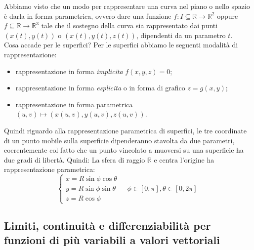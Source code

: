 \documentclass[a4paper]{article}
\numberwithin{equation}{subsection}
\begin{document}
Abbiamo visto che un modo per rappresentare una curva nel piano o nello spazio è darla in forma parametrica,
ovvero dare una funzione $f : I \subseteq{\mathbb{R} \rightarrow \mathbb{R}^2}$ oppure $f \subseteq \mathbb{R} \rightarrow \mathbb{R}^3$
tale che il sostegno della curva sia rappresentato dai punti $(x(t), y(t))$ o $(x(t), y(t), z(t))$, dipendenti
da un parametro $t$. \\
Cosa accade per le superfici? Per le superfici abbiamo le seguenti modalità di rappresentazione: 
\begin{itemize}
    \item rappresentazione in forma \textit{implicita} $f(x,y,z) = 0$;
    \item rappresentazione in forma \textit{esplicita} o in forma di grafico $z = g(x,y)$;
    \item rappresentazione in forma parametrica $(u,v) \mapsto (x(u,v), y(u,v), z(u,v))$.
\end{itemize}
Quindi riguardo alla rappresentazione parametrica di superfici, le tre coordinate di un punto mobile
sulla superficie dipenderanno stavolta da due parametri, coerentemente col fatto che un punto vincolato
a muoversi su una superficie ha due gradi di libertà. Quindi:
\ex{}
{
    La sfera di raggio $\mathbb{R}$ e centra l'origine ha rappresentazione parametrica:
    \[\begin{cases}
        x = R\sin{\phi}\cos{\theta}\\
        y = R\sin{\phi}\sin{\theta} \; \; \; \; \; \; \phi \in [0, \pi], \theta \in [0, 2\pi]\\
        z = R\cos{\phi}
    \end{cases}\]
}

\subsection{Limiti, continuità e differenziabilità per funzioni di più variabili a valori vettoriali}
\end{document}
